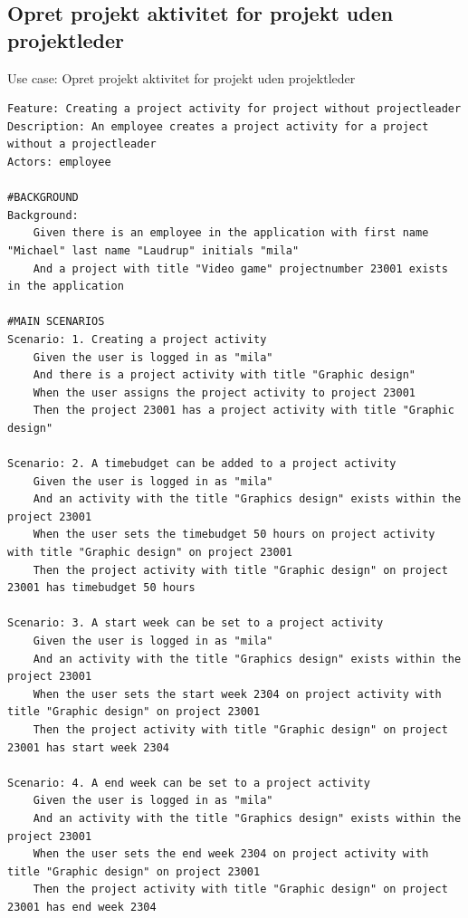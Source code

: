 \subsection{Opret projekt aktivitet for projekt uden projektleder} 
\begin{listing}[H]
    \centering
    \caption{Use case: Opret projekt aktivitet for projekt uden projektleder} \label{lst:usecase_project_activity_no_leader}
    \begin{verbatim}  
Feature: Creating a project activity for project without projectleader
Description: An employee creates a project activity for a project without a projectleader
Actors: employee

#BACKGROUND
Background:
    Given there is an employee in the application with first name "Michael" last name "Laudrup" initials "mila"
    And a project with title "Video game" projectnumber 23001 exists in the application

#MAIN SCENARIOS
Scenario: 1. Creating a project activity
    Given the user is logged in as "mila"
    And there is a project activity with title "Graphic design"  
    When the user assigns the project activity to project 23001 
    Then the project 23001 has a project activity with title "Graphic design" 

Scenario: 2. A timebudget can be added to a project activity
    Given the user is logged in as "mila"
    And an activity with the title "Graphics design" exists within the project 23001
    When the user sets the timebudget 50 hours on project activity with title "Graphic design" on project 23001
    Then the project activity with title "Graphic design" on project 23001 has timebudget 50 hours 

Scenario: 3. A start week can be set to a project activity
    Given the user is logged in as "mila"
    And an activity with the title "Graphics design" exists within the project 23001
    When the user sets the start week 2304 on project activity with title "Graphic design" on project 23001
    Then the project activity with title "Graphic design" on project 23001 has start week 2304

Scenario: 4. A end week can be set to a project activity
    Given the user is logged in as "mila"
    And an activity with the title "Graphics design" exists within the project 23001
    When the user sets the end week 2304 on project activity with title "Graphic design" on project 23001
    Then the project activity with title "Graphic design" on project 23001 has end week 2304


\end{verbatim}
\end{listing}
